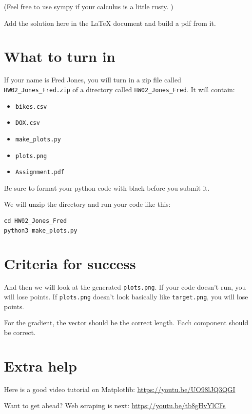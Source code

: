 \documentclass[11pt,english]{article}
\begin{document}
(Feel free to use sympy  if your calculus is a little rusty. )

Add the solution here in the LaTeX document and build a pdf from it.  

\section{What to turn in}

If your name is Fred Jones, you will turn in a zip file called  \texttt{HW02\_Jones\_Fred.zip} of a directory called  \texttt{HW02\_Jones\_Fred}.  It will contain:
\begin{itemize}
\item \texttt{bikes.csv}
\item \texttt{DOX.csv}
\item \texttt{make\_plots.py}
\item \texttt{plots.png}
\item \texttt{Assignment.pdf}
\end{itemize}

Be sure to format your python code with black before you submit it.

We will unzip the directory and run your code like this:
\begin{verbatim}
cd HW02_Jones_Fred
python3 make_plots.py
\end{verbatim}

\section{Criteria for success}

And then we will look at the generated \texttt{plots.png}.  If your code doesn't run, you will lose points.  If \texttt{plots.png} doesn't look basically like \texttt{target.png}, you will lose points.

For the gradient,  the vector should be the correct length.  Each component should be correct.

\section{Extra help}

Here is a good video tutorial on Matplotlib:
\url{https://youtu.be/UO98lJQ3QGI}

Want to get ahead?  Web scraping is next:
\url{https://youtu.be/tb8gHvYlCFs}
\end{document}
